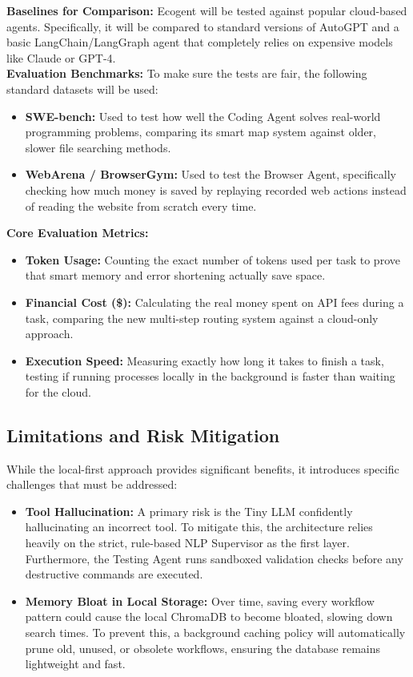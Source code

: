 \textbf{Baselines for Comparison:}
Ecogent will be tested against popular cloud-based agents. Specifically, it will be compared to standard versions of AutoGPT and a basic LangChain/LangGraph agent that completely relies on expensive models like Claude or GPT-4.\\

\textbf{Evaluation Benchmarks:}
To make sure the tests are fair, the following standard datasets will be used:\\
\begin{itemize}
    \item \textbf{SWE-bench:} Used to test how well the Coding Agent solves real-world programming problems, comparing its smart map system against older, slower file searching methods.
    \item \textbf{WebArena / BrowserGym:} Used to test the Browser Agent, specifically checking how much money is saved by replaying recorded web actions instead of reading the website from scratch every time.
\end{itemize}

\textbf{Core Evaluation Metrics:}
\begin{itemize}
    \item \textbf{Token Usage:} Counting the exact number of tokens used per task to prove that smart memory and error shortening actually save space.
    \item \textbf{Financial Cost (\$):} Calculating the real money spent on API fees during a task, comparing the new multi-step routing system against a cloud-only approach.
    \item \textbf{Execution Speed:} Measuring exactly how long it takes to finish a task, testing if running processes locally in the background is faster than waiting for the cloud.
\end{itemize}

\subsection{Limitations and Risk Mitigation}
While the local-first approach provides significant benefits, it introduces specific challenges that must be addressed:\\
\begin{itemize}
    \item \textbf{Tool Hallucination:} A primary risk is the Tiny LLM confidently hallucinating an incorrect tool. To mitigate this, the architecture relies heavily on the strict, rule-based NLP Supervisor as the first layer. Furthermore, the Testing Agent runs sandboxed validation checks before any destructive commands are executed.
    \item \textbf{Memory Bloat in Local Storage:} Over time, saving every workflow pattern could cause the local ChromaDB to become bloated, slowing down search times. To prevent this, a background caching policy will automatically prune old, unused, or obsolete workflows, ensuring the database remains lightweight and fast.
\end{itemize}
